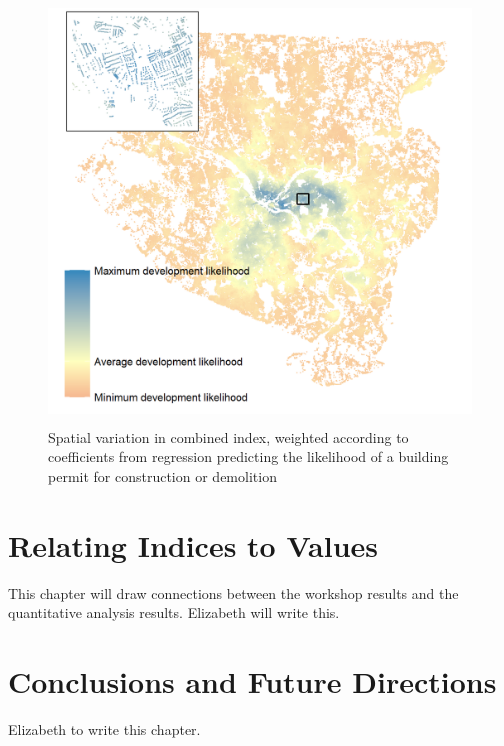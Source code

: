 \documentclass[
]{book}
\begin{document}
\begin{figure}
\includegraphics[width=1\linewidth]{04_figures/combined} \caption{Spatial variation in combined index, weighted according to coefficients from regression predicting the likelihood of a building permit for construction or demolition}\label{fig:combined-map}
\end{figure}

\hypertarget{relating-indices-to-values}{%
\chapter{Relating Indices to Values}\label{relating-indices-to-values}}

This chapter will draw connections between the workshop
results and the quantitative analysis results. Elizabeth will write this.

\hypertarget{conclusions-and-future-directions}{%
\chapter{Conclusions and Future Directions}\label{conclusions-and-future-directions}}

Elizabeth to write this chapter.

  
\end{document}
